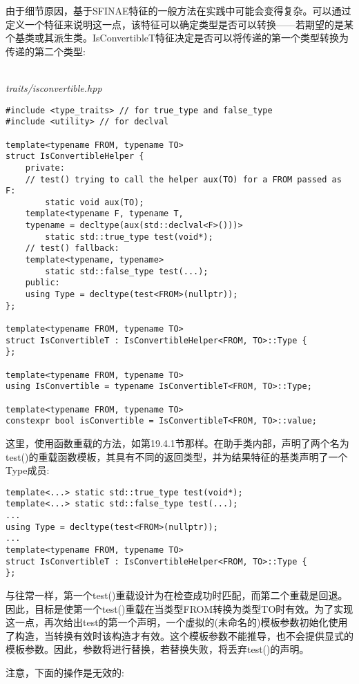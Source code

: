 由于细节原因，基于SFINAE特征的一般方法在实践中可能会变得复杂。可以通过定义一个特征来说明这一点，该特征可以确定类型是否可以转换——若期望的是某个基类或其派生类。IsConvertibleT特征决定是否可以将传递的第一个类型转换为传递的第二个类型:

\hspace*{\fill} \\ %
\noindent
\textit{traits/isconvertible.hpp}
\begin{lstlisting}[style=styleCXX]
#include <type_traits> // for true_type and false_type
#include <utility> // for declval

template<typename FROM, typename TO>
struct IsConvertibleHelper {
	private:
	// test() trying to call the helper aux(TO) for a FROM passed as F:
		static void aux(TO);
	template<typename F, typename T,
	typename = decltype(aux(std::declval<F>()))>
		static std::true_type test(void*);
	// test() fallback:
	template<typename, typename>
		static std::false_type test(...);
	public:
	using Type = decltype(test<FROM>(nullptr));
};

template<typename FROM, typename TO>
struct IsConvertibleT : IsConvertibleHelper<FROM, TO>::Type {
};

template<typename FROM, typename TO>
using IsConvertible = typename IsConvertibleT<FROM, TO>::Type;

template<typename FROM, typename TO>
constexpr bool isConvertible = IsConvertibleT<FROM, TO>::value;
\end{lstlisting}

这里，使用函数重载的方法，如第19.4.1节那样。在助手类内部，声明了两个名为test()的重载函数模板，其具有不同的返回类型，并为结果特征的基类声明了一个Type成员:

\begin{lstlisting}[style=styleCXX]
template<...> static std::true_type test(void*);
template<...> static std::false_type test(...);
...
using Type = decltype(test<FROM>(nullptr));
...
template<typename FROM, typename TO>
struct IsConvertibleT : IsConvertibleHelper<FROM, TO>::Type {
};
\end{lstlisting}

与往常一样，第一个test()重载设计为在检查成功时匹配，而第二个重载是回退。因此，目标是使第一个test()重载在当类型FROM转换为类型TO时有效。为了实现这一点，再次给出test的第一个声明，一个虚拟的(未命名的)模板参数初始化使用了构造，当转换有效时该构造才有效。这个模板参数不能推导，也不会提供显式的模板参数。因此，参数将进行替换，若替换失败，将丢弃test()的声明。

注意，下面的操作是无效的:

